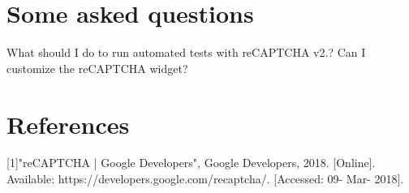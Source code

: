 \documentclass{article}
\begin{document}
\section{Some asked questions}
What should I do to run automated tests with reCAPTCHA v2.?
\newline Can I customize the reCAPTCHA widget?
\section{References}
 [1]"reCAPTCHA  |  Google Developers", Google Developers, 2018. [Online]. Available: https://developers.google.com/recaptcha/. [Accessed: 09- Mar- 2018].
\end{document}
